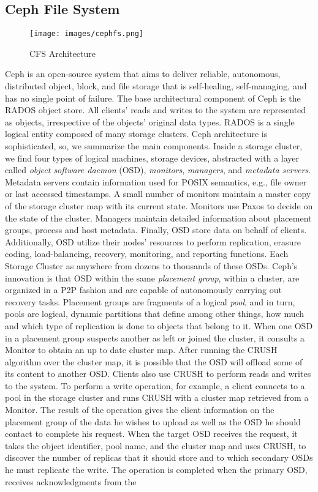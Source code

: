 \documentclass[runningheads]{llncs}
\begin{document}
\subsection{Ceph File System}

\begin{figure}[t]
\centering
\texttt{[image: images/cephfs.png]}
\caption{CFS Architecture}
\label{fig:cfs_arch}
\end{figure}

Ceph \cite{ceph} is an open-source system that aims to deliver reliable, autonomous, distributed object, block, and file storage that is self-healing, self-managing, and has no single point of failure. The base architectural component of Ceph is the RADOS object store. All clients' reads and writes to the system are represented as objects, irrespective of the objects' original data types. RADOS is a single logical entity composed of many storage clusters. Ceph architecture is sophisticated, so, we summarize the main components. Inside a storage cluster, we find four types of logical machines, storage devices, abstracted with a layer called \textit{object software daemon} (OSD), \textit{monitors}, \textit{managers}, and \textit{metadata servers}. Metadata servers contain information used for POSIX semantics, e.g., file owner or last accessed timestamps. A small number of monitors maintain a master copy of the storage cluster map with its current state. Monitors use Paxos to decide on the state of the cluster. Managers maintain detailed information about placement groups, process and host metadata. Finally, OSD store data on behalf of clients. Additionally, OSD utilize their nodes' resources to perform replication, erasure coding, load-balancing, recovery, monitoring, and reporting functions. Each Storage Cluster as anywhere from dozens to thousands of these OSDs. Ceph's innovation is that OSD within the same \textit{placement group}, within a cluster, are organized in a P2P fashion and are capable of autonomously carrying out recovery tasks. Placement groups are fragments of a logical \textit{pool}, and in turn, pools are logical, dynamic partitions that define among other things, how much and which type of replication is done to objects that belong to it. When one OSD in a placement group suspects another as left or joined the cluster, it consults a Monitor to obtain an up to date cluster map. After running the CRUSH algorithm\cite{crush} over the cluster map, it is possible that the OSD will offload some of its content to another OSD. Clients also use CRUSH to perform reads and writes to the system. To perform a write operation, for example, a client connects to a pool in the storage cluster and runs CRUSH with a cluster map retrieved from a Monitor. The result of the operation gives the client information on the placement group of the data he wishes to upload as well as the OSD he should contact to complete his request. When the target OSD receives the request, it takes the object identifier, pool name, and the cluster map and uses CRUSH, to discover the number of replicas that it should store and to which secondary OSDs he must replicate the write. The operation is completed when the primary OSD, receives acknowledgments from the 
\end{document}
